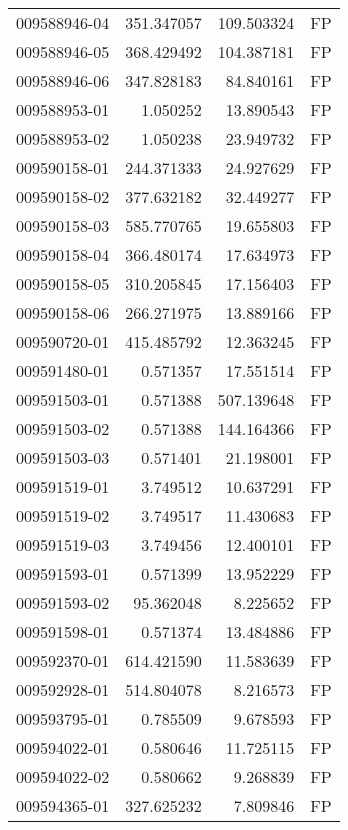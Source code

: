 \begin{tabular}{lrrl}
009588946-04 &  351.347057 &     109.503324 &   FP \\
009588946-05 &  368.429492 &     104.387181 &   FP \\
009588946-06 &  347.828183 &      84.840161 &   FP \\
009588953-01 &    1.050252 &      13.890543 &   FP \\
009588953-02 &    1.050238 &      23.949732 &   FP \\
009590158-01 &  244.371333 &      24.927629 &   FP \\
009590158-02 &  377.632182 &      32.449277 &   FP \\
009590158-03 &  585.770765 &      19.655803 &   FP \\
009590158-04 &  366.480174 &      17.634973 &   FP \\
009590158-05 &  310.205845 &      17.156403 &   FP \\
009590158-06 &  266.271975 &      13.889166 &   FP \\
009590720-01 &  415.485792 &      12.363245 &   FP \\
009591480-01 &    0.571357 &      17.551514 &   FP \\
009591503-01 &    0.571388 &     507.139648 &   FP \\
009591503-02 &    0.571388 &     144.164366 &   FP \\
009591503-03 &    0.571401 &      21.198001 &   FP \\
009591519-01 &    3.749512 &      10.637291 &   FP \\
009591519-02 &    3.749517 &      11.430683 &   FP \\
009591519-03 &    3.749456 &      12.400101 &   FP \\
009591593-01 &    0.571399 &      13.952229 &   FP \\
009591593-02 &   95.362048 &       8.225652 &   FP \\
009591598-01 &    0.571374 &      13.484886 &   FP \\
009592370-01 &  614.421590 &      11.583639 &   FP \\
009592928-01 &  514.804078 &       8.216573 &   FP \\
009593795-01 &    0.785509 &       9.678593 &   FP \\
009594022-01 &    0.580646 &      11.725115 &   FP \\
009594022-02 &    0.580662 &       9.268839 &   FP \\
009594365-01 &  327.625232 &       7.809846 &   FP \\

\end{tabular}
